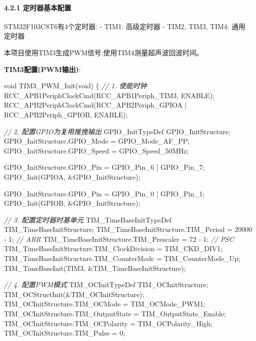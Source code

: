 \documentclass[
]{article}
\newenvironment{Shaded}{}{}
\newcommand{\CommentTok}[1]{\textcolor[rgb]{0.38,0.63,0.69}{\textit{#1}}}
\newcommand{\DataTypeTok}[1]{\textcolor[rgb]{0.56,0.13,0.00}{#1}}
\newcommand{\DecValTok}[1]{\textcolor[rgb]{0.25,0.63,0.44}{#1}}
\newcommand{\NormalTok}[1]{#1}
\begin{document}
\hypertarget{ux5b9aux65f6ux5668ux57faux672cux914dux7f6e}{%
\paragraph{4.2.1
定时器基本配置}\label{ux5b9aux65f6ux5668ux57faux672cux914dux7f6e}}

STM32F103C8T6有4个定时器: - TIM1: 高级定时器 - TIM2, TIM3, TIM4:
通用定时器

本项目使用TIM3生成PWM信号,使用TIM4测量超声波回波时间。

\textbf{TIM3配置(PWM输出)}:

\begin{Shaded}
\begin{Highlighting}[]
\DataTypeTok{void}\NormalTok{ TIM3\_PWM\_Init(}\DataTypeTok{void}\NormalTok{)}
\NormalTok{\{}
    \CommentTok{// 1. 使能时钟}
\NormalTok{    RCC\_APB1PeriphClockCmd(RCC\_APB1Periph\_TIM3, ENABLE);}
\NormalTok{    RCC\_APB2PeriphClockCmd(RCC\_APB2Periph\_GPIOA | RCC\_APB2Periph\_GPIOB, ENABLE);}
    
    \CommentTok{// 2. 配置GPIO为复用推挽输出}
\NormalTok{    GPIO\_InitTypeDef GPIO\_InitStructure;}
\NormalTok{    GPIO\_InitStructure.GPIO\_Mode = GPIO\_Mode\_AF\_PP;}
\NormalTok{    GPIO\_InitStructure.GPIO\_Speed = GPIO\_Speed\_50MHz;}
    
\NormalTok{    GPIO\_InitStructure.GPIO\_Pin = GPIO\_Pin\_6 | GPIO\_Pin\_7;}
\NormalTok{    GPIO\_Init(GPIOA, \&GPIO\_InitStructure);}
    
\NormalTok{    GPIO\_InitStructure.GPIO\_Pin = GPIO\_Pin\_0 | GPIO\_Pin\_1;}
\NormalTok{    GPIO\_Init(GPIOB, \&GPIO\_InitStructure);}
    
    \CommentTok{// 3. 配置定时器时基单元}
\NormalTok{    TIM\_TimeBaseInitTypeDef TIM\_TimeBaseInitStructure;}
\NormalTok{    TIM\_TimeBaseInitStructure.TIM\_Period = }\DecValTok{20000}\NormalTok{ {-} }\DecValTok{1}\NormalTok{;        }\CommentTok{// ARR}
\NormalTok{    TIM\_TimeBaseInitStructure.TIM\_Prescaler = }\DecValTok{72}\NormalTok{ {-} }\DecValTok{1}\NormalTok{;        }\CommentTok{// PSC}
\NormalTok{    TIM\_TimeBaseInitStructure.TIM\_ClockDivision = TIM\_CKD\_DIV1;}
\NormalTok{    TIM\_TimeBaseInitStructure.TIM\_CounterMode = TIM\_CounterMode\_Up;}
\NormalTok{    TIM\_TimeBaseInit(TIM3, \&TIM\_TimeBaseInitStructure);}
    
    \CommentTok{// 4. 配置PWM模式}
\NormalTok{    TIM\_OCInitTypeDef TIM\_OCInitStructure;}
\NormalTok{    TIM\_OCStructInit(\&TIM\_OCInitStructure);}
\NormalTok{    TIM\_OCInitStructure.TIM\_OCMode = TIM\_OCMode\_PWM1;}
\NormalTok{    TIM\_OCInitStructure.TIM\_OutputState = TIM\_OutputState\_Enable;}
\NormalTok{    TIM\_OCInitStructure.TIM\_OCPolarity = TIM\_OCPolarity\_High;}
\NormalTok{    TIM\_OCInitStructure.TIM\_Pulse = }\DecValTok{0}\NormalTok{;}
    

\end{Highlighting}
\end{Shaded}
\end{document}
